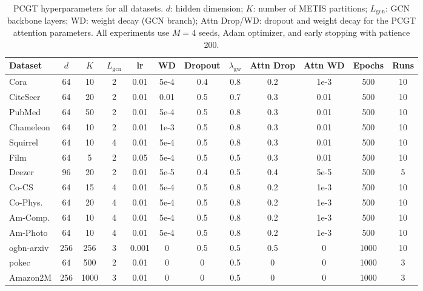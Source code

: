 \documentclass[sigconf]{acmart}
\begin{document}
\begin{table}[t]
\centering
\footnotesize
\setlength{\tabcolsep}{3pt}
\begin{tabular}{l|ccccccccccc}
\toprule
\textbf{Dataset} & $d$ & \textbf{$K$} & $L_\text{gcn}$ & \textbf{lr} & \textbf{WD} & \textbf{Dropout} & $\lambda_\text{gw}$ & \textbf{Attn Drop} & \textbf{Attn WD} & \textbf{Epochs} & \textbf{Runs} \\
\midrule
Cora         & 64  & 10  & 2 & 0.01  & 5e-4  & 0.4 & 0.8 & 0.2 & 1e-3 & 500  & 10 \\
CiteSeer     & 64  & 20  & 2 & 0.01  & 0.01  & 0.5 & 0.7 & 0.3 & 0.01 & 500  & 10 \\
PubMed       & 64  & 50  & 2 & 0.01  & 5e-4  & 0.5 & 0.8 & 0.3 & 0.01 & 500  & 10 \\
Chameleon    & 64  & 10  & 2 & 0.01  & 1e-3  & 0.5 & 0.8 & 0.3 & 0.01 & 500  & 10 \\
Squirrel     & 64  & 10  & 4 & 0.01  & 5e-4  & 0.5 & 0.8 & 0.3 & 0.01 & 500  & 10 \\
Film         & 64  & 5   & 2 & 0.05  & 5e-4  & 0.5 & 0.5 & 0.3 & 0.01 & 500  & 10 \\
Deezer       & 96  & 20  & 2 & 0.01  & 5e-5  & 0.4 & 0.5 & 0.4 & 5e-5 & 500  & 5 \\
Co-CS        & 64  & 15  & 4 & 0.01  & 5e-4  & 0.5 & 0.8 & 0.2 & 1e-3 & 500  & 10 \\
Co-Phys.     & 64  & 20  & 4 & 0.01  & 5e-4  & 0.5 & 0.8 & 0.2 & 1e-3 & 500  & 10 \\
Am-Comp.     & 64  & 10  & 4 & 0.01  & 5e-4  & 0.5 & 0.8 & 0.2 & 1e-3 & 500  & 10 \\
Am-Photo     & 64  & 10  & 4 & 0.01  & 5e-4  & 0.5 & 0.8 & 0.2 & 1e-3 & 500  & 10 \\
\midrule
ogbn-arxiv   & 256 & 256 & 3 & 0.001 & 0     & 0.5 & 0.5 & 0.5 & 0    & 1000 & 10 \\
pokec        & 64  & 500 & 2 & 0.01  & 0     & 0   & 0.5 & 0   & 0    & 1000 & 3 \\
Amazon2M     & 256 & 1000 & 3 & 0.01 & 0     & 0   & 0.5 & 0   & 0    & 1000 & 3 \\
\bottomrule
\end{tabular}
\caption{PCGT hyperparameters for all datasets. $d$: hidden dimension; $K$: number of METIS partitions; $L_\text{gcn}$: GCN backbone layers; WD: weight decay (GCN branch); Attn Drop/WD: dropout and weight decay for the PCGT attention parameters. All experiments use $M=4$ seeds, Adam optimizer, and early stopping with patience 200.}
\label{tab:hyperparams}
\end{table}
\end{document}
